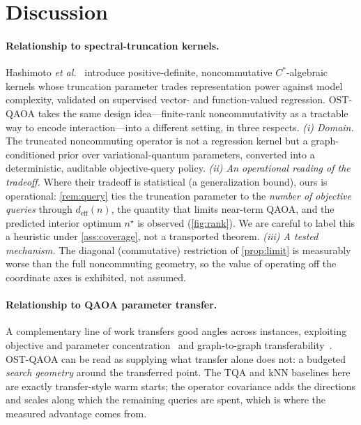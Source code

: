 \documentclass[aps,prresearch,reprint,amsmath,amssymb,floatfix,nofootinbib,superscriptaddress,longbibliography]{revtex4-2}
\theoremstyle{remark}
\newcommand{\OSTQAOA}{\textnormal{\textsc{OST-QAOA}}}
\newcommand{\TQA}{\textnormal{\textsc{TQA}}}
\begin{document}
\begin{table}[t]
\centering
\caption{\textbf{Artifact manifest.}  Each manuscript display item is generated
by the package-native artifact driver.}
\label{tab:manifest}

\end{table}

\section{Discussion}

\paragraph{Relationship to spectral-truncation kernels.}
Hashimoto \emph{et al.}~\cite{hashimoto2024spectral} introduce positive-definite,
noncommutative \(C^*\)-algebraic kernels whose truncation parameter trades
representation power against model complexity, validated on supervised vector-
and function-valued regression.  \OSTQAOA{} takes the same design idea---finite-rank
noncommutativity as a tractable way to encode interaction---into a different
setting, in three respects.  \emph{(i) Domain.}  The truncated noncommuting
operator is not a regression kernel but a graph-conditioned prior over
variational-quantum parameters, converted into a deterministic, auditable
objective-query policy.  \emph{(ii) An operational reading of the tradeoff.}
Where their tradeoff is statistical (a generalization bound), ours is operational:
\cref{rem:query} ties the truncation parameter to the \emph{number of objective
queries} through \(d_{\mathrm{eff}}(n)\), the quantity that limits near-term QAOA,
and the predicted interior optimum \(n^{\star}\) is observed (\cref{fig:rank}).
We are careful to label this a heuristic under \cref{ass:coverage}, not a
transported theorem.  \emph{(iii) A tested mechanism.}  The diagonal (commutative)
restriction of \cref{prop:limit} is measurably worse than the full noncommuting
geometry, so the value of operating off the coordinate axes is exhibited, not
assumed.

\paragraph{Relationship to QAOA parameter transfer.}
A complementary line of work transfers good angles across instances, exploiting
objective and parameter concentration~\cite{brandao2018,akshay2021} and
graph-to-graph transferability~\cite{galda2021,shaydulin2023transfer}.
\OSTQAOA{} can be read as supplying what transfer alone does not: a budgeted
\emph{search geometry} around the transferred point.  The \TQA{} and kNN
baselines here are exactly transfer-style warm starts; the operator covariance
adds the directions and scales along which the remaining queries are spent, which
is where the measured advantage comes from.
\end{document}
